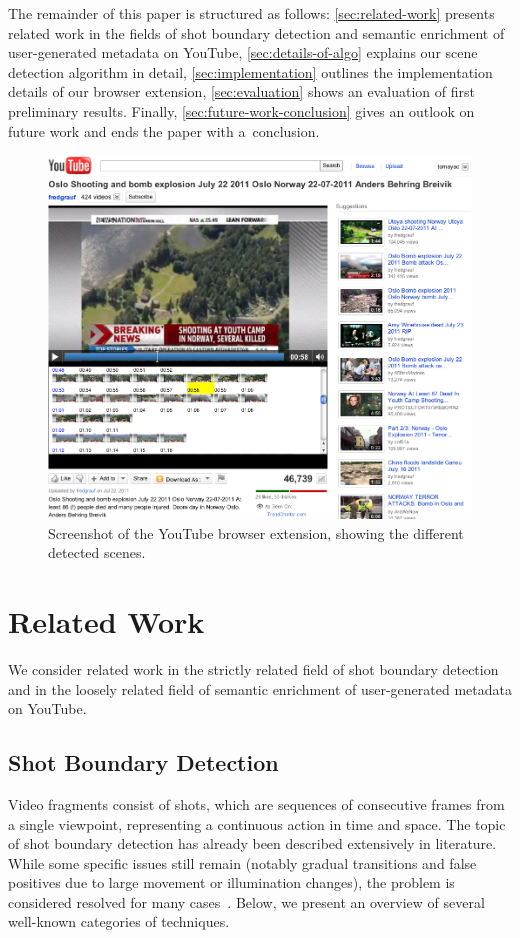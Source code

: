\documentclass[10pt,twocolumn,letterpaper]{article}
\begin{document}
The remainder of this paper is structured as follows: \autoref{sec:related-work} presents related work in the fields of shot boundary detection and semantic enrichment of user-generated metadata on YouTube, \autoref{sec:details-of-algo} explains our scene detection algorithm in detail, \autoref{sec:implementation} outlines the implementation details of our browser extension, \autoref{sec:evaluation} shows an evaluation of first preliminary results. Finally, \autoref{sec:future-work-conclusion} gives an outlook on future work and ends the paper with a~\mbox{conclusion}.

\begin{figure}
\begin{center}
   \includegraphics[width=0.8\linewidth]{./resources/screenshot.png}
\end{center}
   \caption{Screenshot of the YouTube browser extension, showing the different detected scenes.}
\label{fig:screenshot}
\end{figure}

\section{Related Work} \label{sec:related-work}
We consider related work in the strictly related field of shot boundary detection and in the loosely related field of semantic enrichment of user-generated metadata on YouTube.

\subsection{Shot Boundary Detection}
Video fragments consist of shots, which are sequences of consecutive frames from a single viewpoint, representing a continuous action in time and space. The topic of shot boundary detection has already been described extensively in literature. While some specific issues still remain (notably gradual transitions and false positives due to large movement or illumination changes), the problem is considered resolved for many cases~\cite{Hanjalic2002, Yuan2007}. Below, we present an overview of several well-known categories of techniques.
\end{document}
